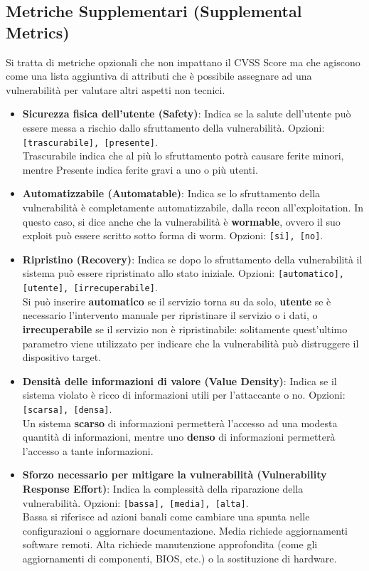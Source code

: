 \documentclass{article}
\begin{document}
\subsection{Metriche Supplementari (Supplemental Metrics)}
Si tratta di metriche opzionali che non impattano il CVSS Score ma che agiscono come una lista aggiuntiva di attributi che è possibile assegnare ad una vulnerabilità per valutare altri aspetti non tecnici.
\begin{itemize}
	\item \textbf{Sicurezza fisica dell'utente (Safety)}: Indica se la salute dell’utente può essere messa a rischio dallo sfruttamento della vulnerabilità. Opzioni: \verb|[trascurabile], [presente]|.\\ Trascurabile indica che al più lo sfruttamento potrà causare ferite minori, mentre Presente indica ferite gravi a uno o più utenti.
	
	\item \textbf{Automatizzabile (Automatable)}: Indica se lo
	sfruttamento della vulnerabilità è completamente automatizzabile, dalla recon all’exploitation. In questo caso, si dice anche che la vulnerabilità è \textbf{wormable}, ovvero il suo exploit può essere scritto sotto forma di worm. Opzioni: \verb|[si], [no]|.
	
	\item \textbf{Ripristino (Recovery)}: Indica se dopo lo sfruttamento della vulnerabilità il sistema può essere ripristinato allo stato iniziale. Opzioni: \verb|[automatico], [utente], [irrecuperabile]|.\\
	Si può inserire \textbf{automatico} se il servizio torna su da solo, \textbf{utente} se è necessario l’intervento manuale per ripristinare il servizio o i dati, o \textbf{irrecuperabile} se il servizio non è ripristinabile: solitamente quest’ultimo parametro viene utilizzato per indicare che la vulnerabilità può distruggere il dispositivo target.

	\item \textbf{Densità delle informazioni di valore (Value Density)}: Indica se il sistema violato è ricco di informazioni utili per l’attaccante o no. Opzioni: \verb|[scarsa], [densa]|.\\
	Un sistema \textbf{scarso} di informazioni permetterà l’accesso ad una modesta quantità di informazioni, mentre uno \textbf{denso} di informazioni permetterà l’accesso a tante informazioni.
	
	\item \textbf{Sforzo necessario per mitigare la vulnerabilità (Vulnerability Response Effort)}: Indica la complessità della riparazione della vulnerabilità. Opzioni: \verb|[bassa], [media], [alta]|.\\
	Bassa si riferisce ad azioni banali come cambiare una spunta nelle configurazioni o aggiornare documentazione.
	Media richiede aggiornamenti software remoti. Alta richiede manutenzione approfondita (come gli aggiornamenti di componenti, BIOS, etc.) o la sostituzione di hardware.
	

\end{itemize}
\end{document}
